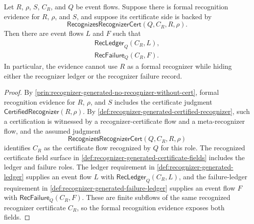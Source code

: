 \begin{lemma}
\label{lem:recognizer-generated-certified-certificate-exposes-ledger-failure}
Let $R$, $\rho$, $S$, $C_R$, and $Q$ be event flows. Suppose there is formal recognition evidence for $R$, $\rho$, and $S$, and suppose its certificate side is backed by
$$
  \mathsf{RecognizesRecognizerCert}(Q,C_R,R,\rho).
$$
Then there are event flows $L$ and $F$ such that
$$
\begin{gathered}
  \mathsf{RecLedger}_Q(C_R,L),\\
  \mathsf{RecFailure}_Q(C_R,F).
\end{gathered}
$$
In particular, the evidence cannot use $R$ as a formal recognizer while hiding either the recognizer ledger or the recognizer failure record.
\end{lemma}

\begin{proof}
By \autoref{prin:recognizer-generated-no-recognizer-without-cert}, formal recognition evidence for $R$, $\rho$, and $S$ includes the certificate judgment $\mathsf{CertifiedRecognizer}(R,\rho)$. By \autoref{def:recognizer-generated-certified-recognizer}, such a certification is witnessed by a recognizer-certificate flow and a meta-recognizer flow, and the assumed judgment
$$
  \mathsf{RecognizesRecognizerCert}(Q,C_R,R,\rho)
$$
identifies $C_R$ as the certificate flow recognized by $Q$ for this role. The recognized certificate field surface in \autoref{def:recognizer-generated-certificate-fields} includes the ledger and failure roles. The ledger requirement in \autoref{def:recognizer-generated-ledger} supplies an event flow $L$ with $\mathsf{RecLedger}_Q(C_R,L)$, and the failure-ledger requirement in \autoref{def:recognizer-generated-failure-ledger} supplies an event flow $F$ with $\mathsf{RecFailure}_Q(C_R,F)$. These are finite subflows of the same recognized recognizer certificate $C_R$, so the formal recognition evidence exposes both fields.
\end{proof}

